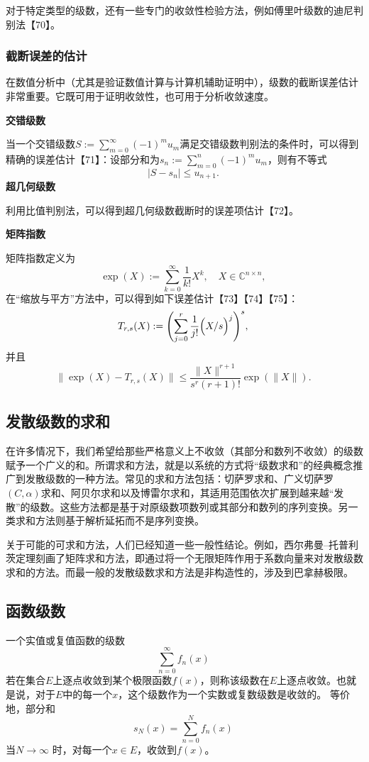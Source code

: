 对于特定类型的级数，还有一些专门的收敛性检验方法，例如傅里叶级数的迪尼判别法【70】。
\subsubsection{截断误差的估计}
在数值分析中（尤其是验证数值计算与计算机辅助证明中），级数的截断误差估计非常重要。它既可用于证明收敛性，也可用于分析收敛速度。

\textbf{交错级数}

当一个交错级数$S := \sum_{m=0}^{\infty} (-1)^{m} u_{m}$满足交错级数判别法的条件时，可以得到精确的误差估计【71】：设部分和为$s_{n} := \sum_{m=0}^{n} (-1)^{m} u_{m}$，则有不等式
$$
|S - s_{n}| \leq u_{n+1}.~
$$
\textbf{超几何级数}

利用比值判别法，可以得到超几何级数截断时的误差项估计【72】。

\textbf{矩阵指数}

矩阵指数定义为
$$
\exp(X) := \sum_{k=0}^{\infty} \frac{1}{k!} X^{k}, \quad X \in \mathbb{C}^{n \times n},~
$$
在“缩放与平方”方法中，可以得到如下误差估计【73】【74】【75】：
$$
T_{r,s}(X) := \Biggl( \sum_{j=0}^{r} \frac{1}{j!} \Bigl(X/s\Bigr)^{j} \Biggr)^{s},~
$$
并且
$$
\bigl\|\exp(X) - T_{r,s}(X)\bigr\| \leq \frac{\|X\|^{r+1}}{s^{r}(r+1)!} \exp(\|X\|).~
$$
\subsection{发散级数的求和}
在许多情况下，我们希望给那些严格意义上不收敛（其部分和数列不收敛）的级数赋予一个广义的和。所谓求和方法，就是以系统的方式将“级数求和”的经典概念推广到发散级数的一种方法。常见的求和方法包括：切萨罗求和、广义切萨罗$(C,\alpha)$求和、阿贝尔求和以及博雷尔求和，其适用范围依次扩展到越来越“发散”的级数。这些方法都是基于对原级数项数列或其部分和数列的序列变换。另一类求和方法则基于解析延拓而不是序列变换。

关于可能的可求和方法，人们已经知道一些一般性结论。例如，西尔弗曼–托普利茨定理刻画了矩阵求和方法，即通过将一个无限矩阵作用于系数向量来对发散级数求和的方法。而最一般的发散级数求和方法是非构造性的，涉及到巴拿赫极限。
\subsection{函数级数}
一个实值或复值函数的级数
$$
\sum_{n=0}^{\infty} f_{n}(x)~
$$
若在集合$E$上逐点收敛到某个极限函数$f(x)$，则称该级数在$E$上逐点收敛。也就是说，对于$E$中的每一个$x$，这个级数作为一个实数或复数级数是收敛的。
等价地，部分和
$$
s_{N}(x) = \sum_{n=0}^{N} f_{n}(x)~
$$
当$N \to \infty$ 时，对每一个$x \in E$，收敛到$f(x)$。

